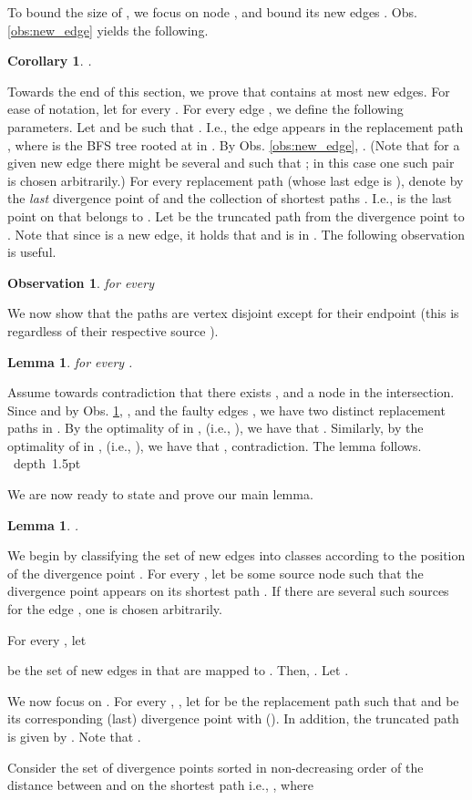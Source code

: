 \documentclass[12pt]{article}
\newtheorem{lemma}[theorem]{Lemma}
\newtheorem{observation}[theorem]{Observation}
\newtheorem{corollary}[theorem]{Corollary}
\def\Proof{\par\noindent{\bf Proof:~}}
\def\blackslug{\hbox{\hskip 1pt \vrule width 4pt height 8pt
    depth 1.5pt \hskip 1pt}}
\def\QED{\quad\blackslug\lower 8.5pt\null\par}
\begin{document}
{To bound the size of , we focus on node ,
and bound its new edges .
Obs. \ref{obs:new_edge} yields the following.
\begin{corollary}
\label{cor:multi_depth}
.
\end{corollary}
Towards the end of this section, we prove that  contains at most  new edges.
For ease of notation, let  for every
. For every edge ,
we define the following parameters. Let  and
 be such that .
I.e., the edge  appears in the replacement  path
, where  is
the BFS tree rooted at  in .
By Obs. \ref{obs:new_edge}, .
(Note that for a given new edge  there might be several 
and  such that ; in this case one such pair  is chosen arbitrarily.)
For every replacement path  (whose last edge is ), denote by
 the \emph{last} divergence point of  and the collection of shortest
 paths .
I.e.,  is the last point on  that belongs to .
Let  be the truncated path from the divergence point  to .
Note that since  is a new edge,
it holds that  and  is
in .
The following observation is useful.
\begin{observation}
\label{obs:pathmulti}
 for every 
\end{observation}
We now show that the paths  are vertex disjoint
except for their endpoint  (this is regardless of their respective source
).
\begin{lemma}
\label{cl:disjointpathmulti2}
 for every .
\end{lemma}
\Proof
Assume towards contradiction that there exists ,
and a node 
in the intersection. Since  and
by Obs. \ref{obs:pathmulti}, ,
and the faulty edges ,
we have two distinct  replacement paths in .
By the optimality of  in ,
(i.e.,  ),
we have that .
Similarly, by the optimality of  in ,
(i.e.,  ),
we have that , contradiction. The lemma follows.
\QED
We are now ready to state and prove our main lemma.
\begin{lemma}
\label{cl:multi_nnew_node}
.
\end{lemma}
We begin by classifying the set of new edges  into 
classes according to the position of the divergence point .
For every , let  be some source node such that the divergence point  appears on its  shortest path .
If there are several such sources for the edge ,
one is chosen arbitrarily.
\par For every , let

be the set of new edges in  that are mapped to .
Then, .
Let .
\par We now focus on . For every , , let  for  be the replacement path such that  and  be its corresponding (last) divergence point with  (). In addition, the truncated path is given by . Note that .
\par Consider the set of divergence points  sorted in non-decreasing order of the distance between  and  on the shortest  path  i.e., , where

}
\end{document}

